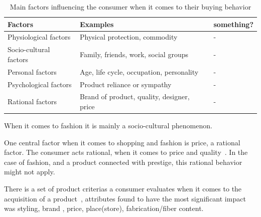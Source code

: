 \begin{table}[H]
    \centering
    \begin{tabular}{l|l|l}
      \textbf{Factors}        & \textbf{Examples} & \textbf{something?} \\ \hline
      Physiological factors   & Physical protection, commodity & - \\ \hline
      Socio-cultural factors  & Family, friends, work, social groups & - \\ \hline
      Personal factors        & Age, life cycle, occupation, personality & - \\ \hline
      Psychological factors   & Product reliance or sympathy & - \\ \hline %
      Rational factors        & Brand of product, quality, designer, price & - \\
    \end{tabular}
    \label{table:FashionFactors}
    \caption [Fashion Factors]{Main factors influencing the consumer when it comes to their buying behavior}
\end{table}
When it comes to fashion it is mainly a socio-cultural phenomenon.

One central factor when it comes to shopping and fashion is price, a rational factor.
The consumer acts rational, when it comes to price and quality~\cite{Hanf1994}.
In the case of fashion, and a product connected with prestige, this rational behavior might not apply.

There is a set of product criterias a consumer evaluates when it comes to the acquisition of a product~\cite{dutton2006}, attributes found to have the most significant impact was styling, brand , price, place(store), fabrication/fiber content.

